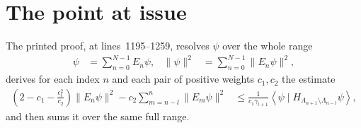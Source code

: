 \documentclass{article}
\begin{document}
\section{The point at issue}

The printed proof, at lines~1195--1259, resolves $\psi$ over the whole range
\begin{align}
    \psi
        &=\sum_{n=0}^{N-1}E_n\psi,
    &
    \lVert\psi\rVert^2
        &=\sum_{n=0}^{N-1}\lVert E_n\psi\rVert^2,
    \label{eq:nachtergaele96_theorem_2_1_lower_endpoint_resolution}
\end{align}
derives for each index $n$ and each pair of positive weights $c_1,c_2$ the
estimate
\begin{align}
    \left(2-c_1-\frac{\epsilon_l^2}{c_2}\right)\lVert E_n\psi\rVert^2
    -c_2\sum_{m=n-l}^{n}\lVert E_m\psi\rVert^2
        &\leq
          \frac{1}{c_1\gamma_{l+1}}
          \left\langle\psi\mid
            H_{\Lambda_{n+1}\setminus\Lambda_{n-l}}\psi\right\rangle,
    \label{eq:nachtergaele96_theorem_2_1_lower_endpoint_per_index}
\end{align}
and then sums it over the same full range.
\end{document}
